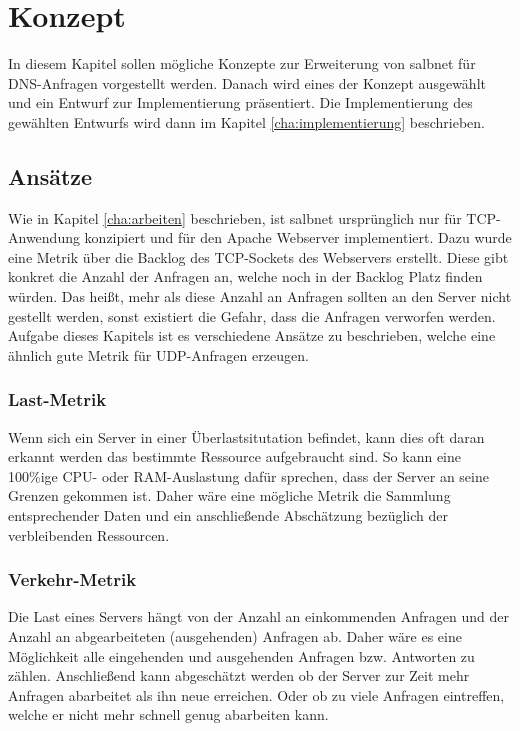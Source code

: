 \documentclass[a4paper, 12pt, BCOR10mm, DIV12, toc=bibliography, toc=listof, german]{scrbook}
\begin{document}

	\chapter{Konzept} %
	\label{cha:konzept}

	In diesem Kapitel sollen mögliche Konzepte zur Erweiterung von salbnet für DNS-Anfragen
	vorgestellt werden. Danach wird eines der Konzept ausgewählt und ein Entwurf zur Implementierung
	präsentiert. Die Implementierung des gewählten Entwurfs wird dann im Kapitel
	\ref{cha:implementierung} beschrieben.


		\section{Ansätze} %
		\label{sec:ansaetze}

		Wie in Kapitel \ref{cha:arbeiten} beschrieben, ist salbnet ursprünglich nur für TCP-Anwendung
		konzipiert und für den Apache Webserver implementiert. Dazu wurde eine Metrik über die Backlog
		des TCP-Sockets des Webservers erstellt. Diese gibt konkret die Anzahl der Anfragen an, welche
		noch in der Backlog Platz finden würden. Das heißt, mehr als diese Anzahl an Anfragen sollten an
		den Server nicht gestellt werden, sonst existiert die Gefahr, dass die Anfragen verworfen
		werden. Aufgabe dieses Kapitels ist es verschiedene Ansätze zu beschrieben, welche eine ähnlich
		gute Metrik für UDP-Anfragen erzeugen. 

		\subsection*{Last-Metrik} %

		Wenn sich ein Server in einer Überlastsitutation befindet, kann dies oft daran erkannt werden
		das bestimmte Ressource aufgebraucht sind. So kann eine 100\%ige CPU- oder RAM-Auslastung dafür
		sprechen, dass der Server an seine Grenzen gekommen ist. Daher wäre eine mögliche Metrik die
		Sammlung entsprechender Daten und ein anschließende Abschätzung bezüglich der verbleibenden
		Ressourcen.
		

		\subsection*{Verkehr-Metrik} %

		Die Last eines Servers hängt von der Anzahl an einkommenden Anfragen und der Anzahl an
		abgearbeiteten (ausgehenden) Anfragen ab. Daher wäre es eine Möglichkeit alle eingehenden und
		ausgehenden Anfragen bzw. Antworten zu zählen. Anschließend kann abgeschätzt werden ob der
		Server zur Zeit mehr Anfragen abarbeitet als ihn neue erreichen. Oder ob zu viele Anfragen
		eintreffen, welche er nicht mehr schnell genug abarbeiten kann.
		
\end{document}
